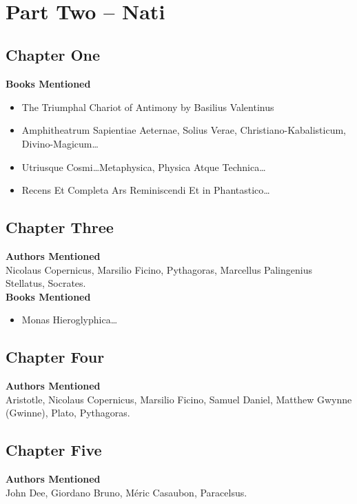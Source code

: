 \documentclass[12pt,makeidx]{extreport}
\newcommand\fleuron{\begin{turn}{45}\Large \ding{166}\end{turn}}
\newcommand\doublefleuron{%
	\reflectbox{\fleuron}\AC\staveXLIX\reflectbox{\AC}\fleuron}
\newcommand\fleuronbar{%
	{\huge\LinearACCCXIII}\xrfill[1.3ex]{1pt}\doublefleuron\xrfill[1.3ex]{1pt}\reflectbox{\huge\LinearACCCXIII}}
\newcommand\nbvspace[1][3]{\vspace*{\stretch{#1}}}
\begin{document}
\begin{center}
\vfill
\shadowoffset{1pt}
\\
\nbvspace[1]
\end{center}

\chapter{Part Two -- Nati}
\section{Chapter One}
\textbf{Books Mentioned}
\begin{itemize}
\item The Triumphal Chariot of Antimony by Basilius Valentinus \cite{Valentinus.1893}
\item Amphitheatrum Sapientiae Aeternae, Solius Verae, Christiano-Kabalisticum, Divino-Magicum\ldots \cite{Khunrath1609}
\item Utriusque Cosmi\ldots Metaphysica, Physica Atque Technica\ldots \cite{Fludd1617}
\item Recens Et Completa Ars Reminiscendi Et in Phantastico\ldots \cite{Bruno1583a}
\end{itemize}

\section{Chapter Three}
\textbf{Authors Mentioned}\\
Nicolaus Copernicus, Marsilio Ficino, Pythagoras, Marcellus Palingenius Stellatus, Socrates.
\\

\hspace{-1.5em}\textbf{Books Mentioned}
\begin{itemize}
\item Monas Hieroglyphica\ldots \cite{Dee1564}
\end{itemize}

\section{Chapter Four}
\textbf{Authors Mentioned}\\
Aristotle, Nicolaus Copernicus, Marsilio Ficino, Samuel Daniel, Matthew Gwynne (Gwinne), Plato, Pythagoras.

\section{Chapter Five}
\textbf{Authors Mentioned}\\
John Dee, Giordano Bruno, Méric Casaubon, Paracelsus.
\\
\end{document}
